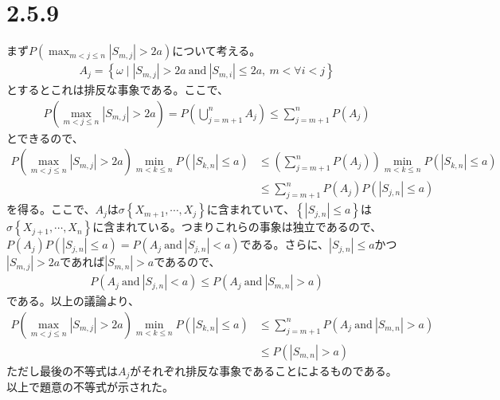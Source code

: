\documentclass{article}
\begin{document}
\section{2.5.9}
まず$P\left( \max_{m<j\leq n} \left|S_{m,j}\right| > 2a \right)$について考える。
\begin{align*}
	A_j = \left\{ \omega\mid \left| S_{m,j} \right| > 2a\ \text{and}\ \left| S_{m,i} \right| \leq 2a,\ m < \forall i < j \right\}
\end{align*}
とするとこれは排反な事象である。ここで、
\begin{align*}
	P\left( \max_{m<j\leq n} \left|S_{m,j}\right| > 2a \right) = P\left( \bigcup_{j=m+1}^n A_j \right) \leq \sum_{j=m+1}^n P\left( A_j \right)
\end{align*}
とできるので、
\begin{align*}
	P\left( \max_{m<j\leq n} \left|S_{m,j}\right| > 2a \right) \min_{m<k \leq n}P\left( \left| S_{k, n} \right| \leq a \right) &\leq \left(\sum_{j=m+1}^n P\left( A_j \right) \right)  \min_{m<k \leq n}P\left( \left| S_{k, n} \right| \leq a \right)\\[10pt]
	&\leq \sum_{j=m+1}^n P\left( A_j \right) P\left( \left| S_{j,n} \right| \leq a \right)
\end{align*}
を得る。ここで、$A_j$は$\sigma\left\{ X_{m+1}, \cdots, X_j \right\}$に含まれていて、$\left\{ \left| S_{j,n} \right| \leq a \right\}$は$\sigma\left\{ X_{j+1}, \cdots, X_n \right\}$に含まれている。つまりこれらの事象は独立であるので、$P\left( A_j \right) P\left( \left| S_{j,n} \right| \leq a \right) = P\left( A_j \ \text{and}\ \left| S_{j,n} \right| < a \right)$である。さらに、$\left| S_{j,n} \right| \leq a$かつ$ \left| S_{m,j} \right| > 2a$であれば$ \left| S_{m,n} \right| > a$であるので、
\begin{align*}
	P\left( A_j \ \text{and}\ \left| S_{j,n} \right| < a \right) \leq P\left( A_j \ \text{and}\ \left| S_{m,n} \right| > a \right)
\end{align*}
である。以上の議論より、
\begin{align*}
	P\left( \max_{m<j\leq n} \left|S_{m,j}\right| > 2a \right) \min_{m<k \leq n}P\left( \left| S_{k, n} \right| \leq a \right) &\leq \sum_{j=m+1}^n P\left( A_j \ \text{and}\ \left| S_{m,n} \right| > a \right)\\[10pt]
	&\leq P\left( \left| S_{m,n} \right| > a \right)
\end{align*}
ただし最後の不等式は$A_j$がそれぞれ排反な事象であることによるものである。以上で題意の不等式が示された。
\end{document}
